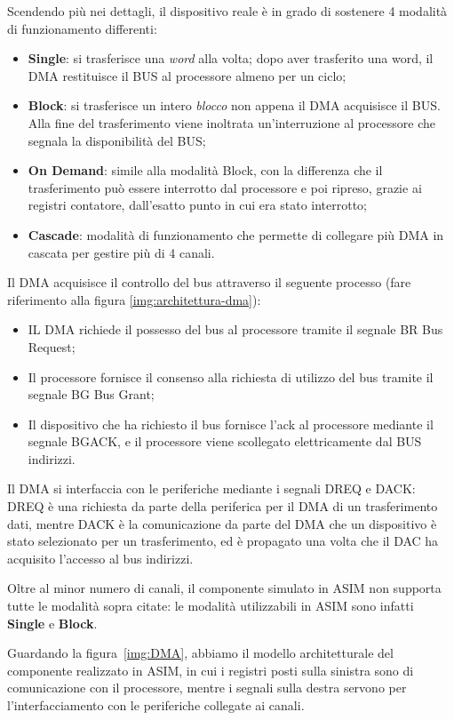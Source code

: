 Scendendo più nei dettagli, il dispositivo reale è in grado di sostenere 4 modalità di funzionamento differenti:
\begin{itemize}
    \item \textbf{Single}: si trasferisce una \textit{word} alla volta; dopo aver trasferito una word, il DMA restituisce il BUS al processore almeno per un ciclo;
    \item \textbf{Block}: si trasferisce un intero \textit{blocco} non appena il DMA acquisisce il BUS. Alla fine del trasferimento viene inoltrata un'interruzione al processore che segnala la disponibilità del BUS;
    \item \textbf{On Demand}: simile alla modalità Block, con la differenza che il trasferimento può essere interrotto dal processore e poi ripreso, grazie ai registri contatore, dall'esatto punto in cui era stato interrotto;
    \item \textbf{Cascade}: modalità di funzionamento che permette di collegare più DMA in cascata per gestire più di 4 canali.
\end{itemize}

Il DMA acquisisce il controllo del bus attraverso il seguente processo (fare riferimento alla figura \ref{img:architettura-dma}):
\begin{itemize}
    \item IL DMA richiede il possesso del bus al processore tramite il segnale BR Bus Request;
    \item Il processore fornisce il consenso alla richiesta di utilizzo del bus tramite il segnale BG Bus Grant;
    \item Il dispositivo che ha richiesto il bus fornisce l'ack al processore mediante il segnale BGACK, e il processore viene scollegato elettricamente dal BUS indirizzi.
\end{itemize}
Il DMA si interfaccia con le periferiche mediante i segnali DREQ e DACK: DREQ è una richiesta da parte della periferica per il DMA di un trasferimento dati, mentre DACK è la comunicazione da parte del DMA che un dispositivo è stato selezionato per un trasferimento, ed è propagato una volta che il DAC ha acquisito l'accesso al bus indirizzi.


Oltre al minor numero di canali, il componente simulato in ASIM non supporta tutte le modalità sopra citate: le modalità utilizzabili in ASIM sono infatti \textbf{Single} e \textbf{Block}.

Guardando la figura~\ref{img:DMA}, abbiamo il modello architetturale del componente realizzato in ASIM, in cui i registri posti sulla sinistra sono di comunicazione con il processore, mentre i segnali sulla destra servono per l'interfacciamento con le periferiche collegate ai canali.

